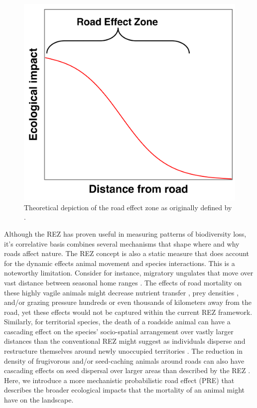 \documentclass[11pt]{article}
\begin{document}
\begin{figure}[h!]
\centering
\includegraphics{REZ}
\caption{Theoretical depiction of the road effect zone as originally defined by \cite{Forman:1998}.}
\label{Fig:REZ}
\end{figure}

Although the REZ has proven useful in measuring patterns of biodiversity loss, it’s correlative basis combines several mechanisms that shape where and why roads affect nature. The REZ concept is also a static measure that does account for the dynamic effects animal movement and species interactions. This is a noteworthy limitation. Consider for instance, migratory ungulates that move over vast distance between seasonal home ranges \citep{Kauffman:2020, Kauffman:2021}. The effects of road mortality on these highly vagile animals might decrease nutrient transfer \citep{Subalusky:2017}, prey densities \citep{Walton:2017}, and/or grazing pressure \citep{Augustine:1998} hundreds or even thousands of kilometers away from the road, yet these effects would not be captured within the current REZ framework. Similarly, for territorial species, the death of a roadside animal can have a cascading effect on the species' socio-spatial arrangement over vastly larger distances than the conventional REZ might suggest as individuals disperse and restructure themselves around newly unoccupied territories \citep{Mumme:2000}. The reduction in density of frugivorous and/or seed-caching animals around roads can also have cascading effects on seed dispersal over larger areas than described by the REZ \citep{Tucker:2021}. Here, we introduce a more mechanistic probabilistic road effect (PRE) that describes the broader ecological impacts that the mortality of an animal might have on the landscape.
\end{document}
